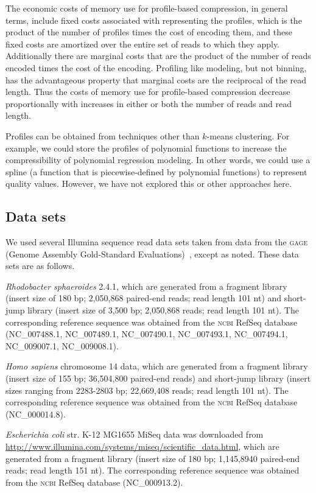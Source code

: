 \documentclass{bioinfo}
\begin{document}
\begin{methods}
The economic costs of memory use for profile-based compression, in
general terms, include fixed costs associated with representing the
profiles, which is the product of the number of profiles times the
cost of encoding them, and these fixed costs are amortized over the
entire set of reads to which they apply. Additionally there are
marginal costs that are the product of the number of reads encoded
times the cost of the encoding. Profiling like modeling, but not
binning, has the advantageous property that marginal costs are the
reciprocal of the read length. Thus the costs of memory use for
profile-based compression decrease proportionally with increases in
either or both the number of reads and read length.

Profiles can be obtained from techniques other than $k$-means
clustering. For example, we could store the profiles of polynomial
functions to increase the compressibility of polynomial regression
modeling. In other words, we could use a spline (a function that is
piecewise-defined by polynomial functions) to represent quality
values. However, we have not explored this or other approaches here.

\subsection{Data sets}

We used several Illumina sequence read data sets taken from data from
the \textsc{gage} (Genome Assembly Gold-Standard
Evaluations)~\citep{Salzberg:2012rc}, except as noted. These data sets
are as follows.

\textit{Rhodobacter sphaeroides} 2.4.1, which are generated from a
fragment library (insert size of 180 bp; 2,050,868 paired-end reads;
read length 101 nt) and short-jump library (insert size of 3,500 bp;
2,050,868 reads; read length 101 nt). The corresponding reference
sequence was obtained from the \textsc{ncbi} RefSeq database
(NC\_007488.1, NC\_007489.1, NC\_007490.1, NC\_007493.1, NC\_007494.1,
NC\_009007.1, NC\_009008.1).

\textit{Homo sapiens} chromosome 14 data, which are generated from a
fragment library (insert size of 155 bp; 36,504,800 paired-end reads)
and short-jump library (insert sizes ranging from 2283-2803 bp;
22,669,408 reads; read length 101 nt). The corresponding reference
sequence was obtained from the \textsc{ncbi} RefSeq database
(NC\_000014.8).

\textit{Escherichia coli} str. K-12 MG1655 MiSeq data was downloaded
from \url{http://www.illumina.com/systems/miseq/scientific_data.html},
which are generated from a fragment library (insert size of 180 bp;
1,145,8940 paired-end reads; read length 151 nt). The corresponding
reference sequence was obtained from the \textsc{ncbi} RefSeq database
(NC\_000913.2).


\end{methods}
\end{document}
